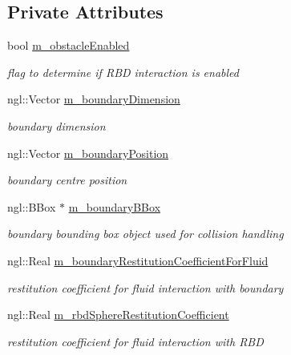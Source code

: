 \subsection*{Private Attributes}
\begin{DoxyCompactItemize}
\item 
bool \hyperlink{class_environment_and_rigid_body_a3d3cb8603f2c0a1688fc2747b4c3ee78}{m\_\-obstacleEnabled}
\begin{DoxyCompactList}\small\item\em flag to determine if RBD interaction is enabled \item\end{DoxyCompactList}\item 
ngl::Vector \hyperlink{class_environment_and_rigid_body_aadb7dcf7549b62ed3dd79534ca552994}{m\_\-boundaryDimension}
\begin{DoxyCompactList}\small\item\em boundary dimension \item\end{DoxyCompactList}\item 
ngl::Vector \hyperlink{class_environment_and_rigid_body_a5508f26bcf4f0cd9bf0db1694f015468}{m\_\-boundaryPosition}
\begin{DoxyCompactList}\small\item\em boundary centre position \item\end{DoxyCompactList}\item 
ngl::BBox $\ast$ \hyperlink{class_environment_and_rigid_body_a59cc8a4afd1d9813b84261dc128b5a9f}{m\_\-boundaryBBox}
\begin{DoxyCompactList}\small\item\em boundary bounding box object used for collision handling \item\end{DoxyCompactList}\item 
ngl::Real \hyperlink{class_environment_and_rigid_body_a45b08a9025d762d4266b03ec1ea86513}{m\_\-boundaryRestitutionCoefficientForFluid}
\begin{DoxyCompactList}\small\item\em restitution coefficient for fluid interaction with boundary \item\end{DoxyCompactList}\item 
ngl::Real \hyperlink{class_environment_and_rigid_body_a4cfcbd844ca7a166697423f403f8d46d}{m\_\-rbdSphereRestitutionCoefficient}
\begin{DoxyCompactList}\small\item\em restitution coefficient for fluid interaction with RBD \item\end{DoxyCompactList}\item 

\end{DoxyCompactItemize}
